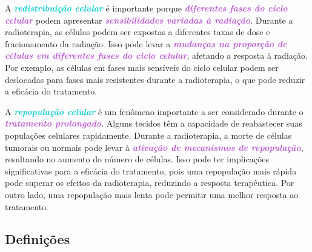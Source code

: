 \documentclass[11pt,a4paper]{article}
\newcounter{exemplo}
\begin{document}
	A \textcolor{DarkTurquoise}{\textbf{\textit{redistribuição celular}}} é importante porque \textcolor{MediumOrchid}{\textbf{\textit{diferentes fases do ciclo celular}}} podem apresentar \textcolor{MediumOrchid}{\textbf{\textit{sensibilidades variadas à radiação}}}. Durante a radioterapia, as células podem ser expostas a diferentes taxas de dose e fracionamento da radiação. Isso pode levar a \textcolor{MediumOrchid}{\textbf{\textit{mudanças na proporção de células em diferentes fases do ciclo celular}}}, afetando a resposta à radiação. Por exemplo, as células em fases mais sensíveis do ciclo celular podem ser deslocadas para fases mais resistentes durante a radioterapia, o que pode reduzir a eficácia do tratamento.

	A \textcolor{DarkTurquoise}{\textbf{\textit{repopulação celular}}} é um fenômeno importante a ser considerado durante o \textcolor{MediumOrchid}{\textbf{\textit{tratamento prolongado}}}. Alguns tecidos têm a capacidade de reabastecer suas populações celulares rapidamente. Durante a radioterapia, a morte de células tumorais ou normais pode levar à \textcolor{MediumOrchid}{\textbf{\textit{ativação de mecanismos de repopulação}}}, resultando no aumento do número de células. Isso pode ter implicações significativas para a eficácia do tratamento, pois uma repopulação mais rápida pode superar os efeitos da radioterapia, reduzindo a resposta terapêutica. Por outro lado, uma repopulação mais lenta pode permitir uma melhor resposta ao tratamento.

\subsection*{Definições}
\end{document}
